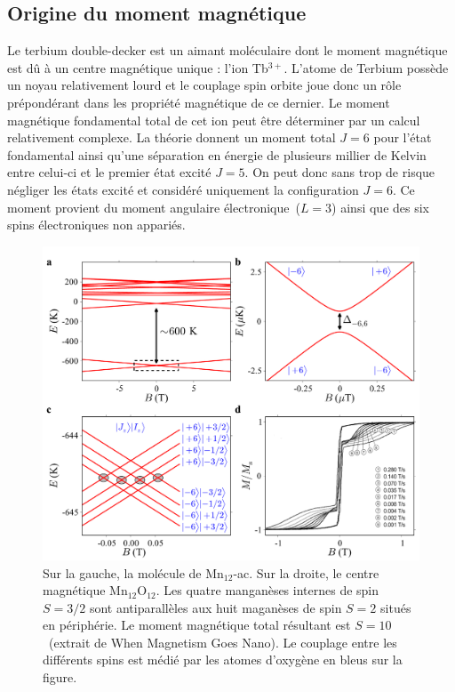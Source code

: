 \subsection{Origine du moment magnétique}
Le terbium double-decker est un aimant moléculaire dont le moment magnétique est d\^u à un centre magnétique unique : l'ion Tb$^{3+}$. L'atome de Terbium possède un noyau relativement lourd et le couplage spin orbite joue donc un r\^ole prépondérant dans les propriété magnétique de ce dernier. Le moment magnétique fondamental total de cet ion peut \^etre déterminer par un calcul relativement complexe. La théorie donnent un moment total $J=6$ pour l'état fondamental ainsi qu'une séparation en énergie de plusieurs millier de Kelvin entre celui-ci et le premier état excité $J=5$. On peut donc sans trop de risque négliger les états excité et considéré uniquement la configuration $J=6$. Ce moment provient du moment angulaire électronique~($L=3$) ainsi que des six spins électroniques non appariés. 

\begin{figure}
\centering \includegraphics[scale=0.5]{Theorie/MagMol/figure4/figure4.pdf} 
\caption{Sur la gauche, la molécule de Mn$_{12}$-ac. Sur la droite, le centre magnétique Mn$_{12}$O$_{12}$. Les quatre manganèses internes de spin $S=3/2$ sont antiparallèles aux huit maganèses de spin $S=2$ situés en périphérie. Le moment magnétique total résultant est $S=10$~(extrait de When Magnetism Goes Nano). Le couplage entre les différents spins est médié par les atomes d'oxygène en bleus sur la figure.}
\label{TbPc2Zeeman}
\end{figure}

